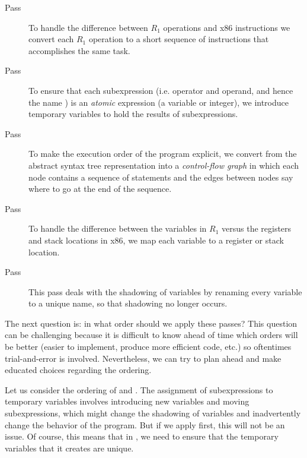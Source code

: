 \documentclass[11pt]{book}
\begin{document}
\begin{description}
\item[Pass ] To handle the difference between
  $R_1$ operations and x86 instructions we convert each $R_1$
  operation to a short sequence of instructions that accomplishes the
  same task.

\item[Pass ] To ensure that each
  subexpression (i.e. operator and operand, and hence the name
  ) is an \emph{atomic} expression (a variable or
  integer), we introduce temporary variables to hold the results
  of subexpressions.
  
\item[Pass ] To make the execution order of the
  program explicit, we convert from the abstract syntax tree
  representation into a \emph{control-flow graph} in which each node
  contains a sequence of statements and the edges between nodes say
  where to go at the end of the sequence.

\item[Pass ] To handle the difference between the
  variables in $R_1$ versus the registers and stack locations in x86,
  we map each variable to a register or stack location.

\item[Pass ] This pass deals with the shadowing of variables
  by renaming every variable to a unique name, so that shadowing no
  longer occurs.
\end{description}

The next question is: in what order should we apply these passes? This
question can be challenging because it is difficult to know ahead of
time which orders will be better (easier to implement, produce more
efficient code, etc.) so oftentimes trial-and-error is
involved. Nevertheless, we can try to plan ahead and make educated
choices regarding the ordering.

Let us consider the ordering of  and
. The assignment of subexpressions to
temporary variables involves introducing new variables and moving
subexpressions, which might change the shadowing of variables and
inadvertently change the behavior of the program.  But if we apply
 first, this will not be an issue. Of course, this means
that in , we need to ensure that the
temporary variables that it creates are unique.
\end{document}
